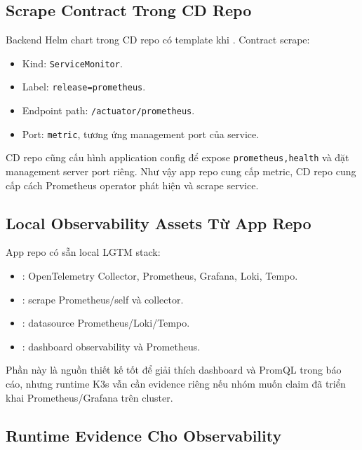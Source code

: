 \subsection{Scrape Contract Trong CD Repo}

Backend Helm chart trong CD repo có template  khi
. Contract scrape:

\begin{itemize}
    \item Kind: \texttt{ServiceMonitor}.
    \item Label: \texttt{release=prometheus}.
    \item Endpoint path: \texttt{/actuator/prometheus}.
    \item Port: \texttt{metric}, tương ứng management port của service.
\end{itemize}

CD repo cũng cấu hình application config để expose \texttt{prometheus,health} và
đặt management server port riêng. Như vậy app repo cung cấp metric, CD repo cung
cấp cách Prometheus operator phát hiện và scrape service.

\subsection{Local Observability Assets Từ App Repo}

App repo có sẵn local LGTM stack:

\begin{itemize}
    \item {}: OpenTelemetry Collector, Prometheus, Grafana, Loki, Tempo.
    \item {}: scrape Prometheus/self và collector.
    \item {}: datasource Prometheus/Loki/Tempo.
    \item {}: dashboard observability và Prometheus.
\end{itemize}

Phần này là nguồn thiết kế tốt để giải thích dashboard và PromQL trong báo cáo,
nhưng runtime K3s vẫn cần evidence riêng nếu nhóm muốn claim đã triển khai
Prometheus/Grafana trên cluster.

\subsection{Runtime Evidence Cho Observability}

